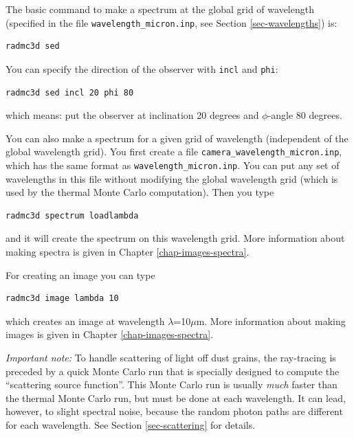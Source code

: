 \documentclass{report}
\begin{document}
The basic command to make a spectrum at the global grid of wavelength
(specified in the file {\small\tt wavelength\_micron.inp},
see Section \ref{sec-wavelengths}) is:
{\small\begin{verbatim}
radmc3d sed
\end{verbatim}}
You can specify the direction of the observer with {\small\tt incl}
and {\small\tt phi}:
{\small\begin{verbatim}
radmc3d sed incl 20 phi 80
\end{verbatim}}
which means: put the observer at inclination 20 degrees and $\phi$-angle
80 degrees.

You can also make a spectrum for a given grid of wavelength (independent
of the global wavelength grid). You first create a file
{\small\tt camera\_wavelength\_micron.inp}, which has the same format
as {\small\tt wavelength\_micron.inp}. You can put any set of wavelengths
in this file without modifying the global wavelength grid (which is used
by the thermal Monte Carlo computation). Then you type
{\small\begin{verbatim}
radmc3d spectrum loadlambda
\end{verbatim}}
and it will create the spectrum on this wavelength grid. More information
about making spectra is given in Chapter \ref{chap-images-spectra}.

For creating an image you can type
{\small\begin{verbatim}
radmc3d image lambda 10
\end{verbatim}}
which creates an image at wavelength $\lambda$=10$\mu$m. More information
about making images is given in Chapter \ref{chap-images-spectra}.

{\em Important note:} To handle scattering of light off dust grains, the
ray-tracing is preceded by a quick Monte Carlo run that is specially
designed to compute the ``scattering source function''. This Monte Carlo
run is usually {\em much} faster than the thermal Monte Carlo run, but must
be done at each wavelength. It can lead, however, to slight spectral noise,
because the random photon paths are different for each wavelength. 
See Section \ref{sec-scattering} for details.
\end{document}
